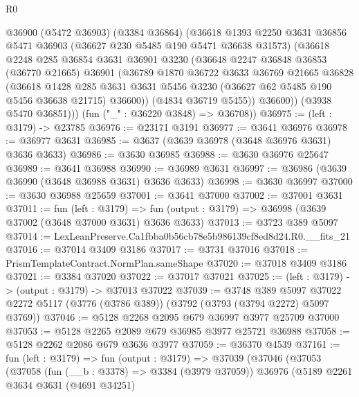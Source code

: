 \begin{lexlean}{R0}
\begin{coremodule}
        @36900
          (@5472 @36903)
          (@3384 @36864)
          (@36618
            @1393
            @2250
            @3631
            @36856
            @5471
            @36903
            (@36627 @230 @5485 @190 @5471 @36638 @31573)
            (@36618
              @2248
              @285
              @36854
              @3631
              @36901
              @3230
              (@36648
                @2247
                @36848
                @36853
                (@36770 @21665)
                @36901
                (@36789
                  @1870
                  @36722
                  @3633
                  @36769
                  @21665
                  @36828
                  (@36618
                    @1428
                    @285
                    @3631
                    @3631
                    @5456
                    @3230
                    (@36627 @62 @5485 @190 @5456 @36638 @21715)
                    @36600))
                (@4834 @36719 @5455))
              @36600))
          (@3938 @5470 @36851)))
      (fun ("_" : @36220 @3848) => @36708))
@36975 := (left : @3179) -> @23785
@36976 := @23171 @3191
@36977 := @3641 @36976
@36978 := @36977 @3631
@36985 := @3637 (@3639 @36978 (@3648 @36976 @3631) @3636 @3633)
@36986 := @3630 @36985
@36988 := @3630 @36976 @25647
@36989 := @3641 @36988
@36990 := @36989 @3631
@36997 := @36986 (@3639 @36990 (@3648 @36988 @3631) @3636 @3633)
@36998 := @3630 @36997
@37000 := @3630 @36988 @25659
@37001 := @3641 @37000
@37002 := @37001 @3631
@37011 := fun (left : @3179) =>
  fun (output : @3179) => @36998 (@3639 @37002 (@3648 @37000 @3631) @3636 @3633)
@37013 := @3723 @389 @5097
@37014 := LexLeanPreserve.Ca1fbba0b56cb78e5b986139cf8ed8d24.R0.__fits_21
@37016 := @37014 @3409 @3186
@37017 := @3731 @37016
@37018 := PrismTemplateContract.NormPlan.sameShape
@37020 := @37018 @3409 @3186
@37021 := @3384 @37020
@37022 := @37017 @37021
@37025 := (left : @3179) -> (output : @3179) -> @37013 @37022
@37039 := @3748
    @389
    @5097
    @37022
    @2272
    @5117
    (@3776 (@3786 @389))
    (@3792 (@3793 (@3794 @2272) @5097 @3769))
@37046 := @5128 @2268 @2095 @679 @36997 @3977 @25709 @37000
@37053 := @5128 @2265 @2089 @679 @36985 @3977 @25721 @36988
@37058 := @5128 @2262 @2086 @679 @3636 @3977
@37059 := @36370 @4539
@37161 := fun (left : @3179) =>
  fun (output : @3179) =>
  @37039
    (@37046
      (@37053
        (@37058
          (fun (__b : @3378) => @3384 (@3979 @37059))
          @36976
          (@5189
            @2261
            @3634
            @3631
            (@4691 @34251)

\end{coremodule}
\end{lexlean}
